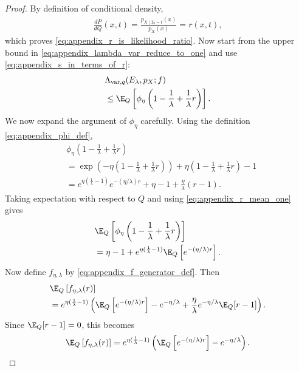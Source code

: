 \begin{proof}
By definition of conditional density,
\begin{align*}
    \frac{dP}{dQ}(x,t)
    = \frac{p_{X\mid T_0=t}(x)}{p_X(x)}
    = r(x,t),
\end{align*}
which proves \eqref{eq:appendix_r_is_likelihood_ratio}.
Now start from the upper bound in \eqref{eq:appendix_lambda_var_reduce_to_one} and use
\eqref{eq:appendix_s_in_terms_of_r}:
\begin{align}
     & \Lambda_{\mathrm{var}, q}(E_\lambda, p_X; f) \nonumber \\
     & \leq \E_Q\left[\phi_\eta\left(1 - \frac{1}{\lambda} + \frac{1}{\lambda}r\right)\right].
    \label{eq:appendix_before_phi_expansion}
\end{align}
We now expand the argument of $\phi_\eta$ carefully. Using the definition
\eqref{eq:appendix_phi_def},
\begin{align}
     & \phi_\eta\left(1 - \frac{1}{\lambda} + \frac{1}{\lambda}r\right) \nonumber \\
     & = \exp\left(-\eta\left(1 - \frac{1}{\lambda} + \frac{1}{\lambda}r\right)\right)
    + \eta\left(1 - \frac{1}{\lambda} + \frac{1}{\lambda}r\right) - 1 \nonumber \\
     & = e^{\eta(\frac{1}{\lambda}-1)} e^{-(\eta/\lambda)r}
    + \eta - 1 + \frac{\eta}{\lambda}(r-1).
    \label{eq:appendix_phi_expanded}
\end{align}
Taking expectation with respect to $Q$ and using \eqref{eq:appendix_r_mean_one} gives
\begin{align}
     & \E_Q\left[\phi_\eta\left(1 - \frac{1}{\lambda} + \frac{1}{\lambda}r\right)\right] \nonumber \\
     & = \eta - 1 + e^{\eta(\frac{1}{\lambda}-1)}\E_Q\left[e^{-(\eta/\lambda)r}\right].
    \label{eq:appendix_phi_after_mean_one}
\end{align}
Now define $f_{\eta,\lambda}$ by \eqref{eq:appendix_f_generator_def}. Then
\begin{align*}
     & \E_Q\left[f_{\eta,\lambda}(r)\right] \\
     & = e^{\eta(\frac{1}{\lambda}-1)}\left(\E_Q\left[e^{-(\eta/\lambda)r}\right] - e^{-\eta/\lambda} + \frac{\eta}{\lambda}e^{-\eta/\lambda}\E_Q[r-1]\right).
\end{align*}
Since $\E_Q[r-1]=0$, this becomes
\begin{align*}
    \E_Q\left[f_{\eta,\lambda}(r)\right]
    = e^{\eta(\frac{1}{\lambda}-1)}\left(\E_Q\left[e^{-(\eta/\lambda)r}\right] - e^{-\eta/\lambda}\right).

\end{align*}
\end{proof}
